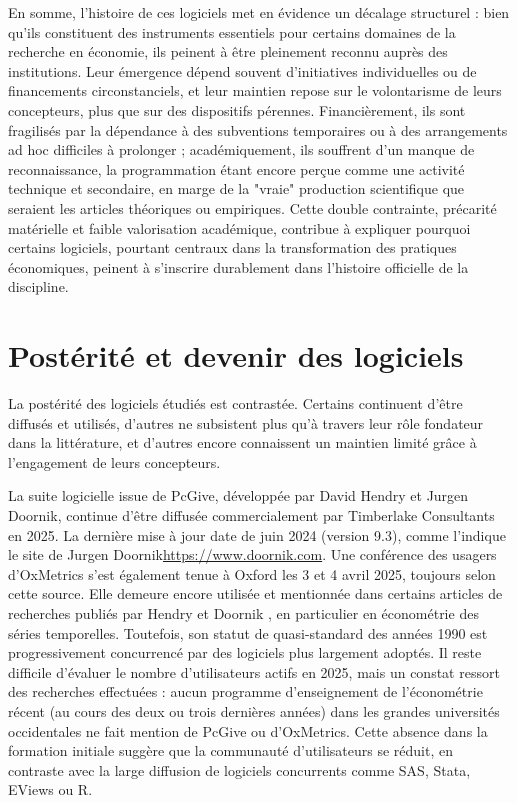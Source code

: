 En somme, l’histoire de ces logiciels met en évidence un décalage structurel : bien qu’ils constituent des instruments essentiels pour certains domaines de la recherche en économie, ils peinent à être pleinement reconnu auprès des institutions. Leur émergence dépend souvent d’initiatives individuelles ou de financements circonstanciels, et leur maintien repose sur le volontarisme de leurs concepteurs, plus que sur des dispositifs pérennes. Financièrement, ils sont fragilisés par la dépendance à des subventions temporaires ou à des arrangements ad hoc difficiles à prolonger ; académiquement, ils souffrent d’un manque de reconnaissance, la programmation étant encore perçue comme une activité technique et secondaire, en marge de la "vraie" production scientifique que seraient les articles théoriques ou empiriques. Cette double contrainte, précarité matérielle et faible valorisation académique, contribue à expliquer pourquoi certains logiciels, pourtant centraux dans la transformation des pratiques économiques, peinent à s’inscrire durablement dans l’histoire officielle de la discipline.




\section{Postérité et devenir des logiciels}


La postérité des logiciels étudiés est contrastée. Certains continuent d’être diffusés et utilisés, d’autres ne subsistent plus qu’à travers leur rôle fondateur dans la littérature, et d’autres encore connaissent un maintien limité grâce à l’engagement de leurs concepteurs.

La suite logicielle issue de PcGive, développée par David Hendry et Jurgen Doornik, continue d’être diffusée commercialement par Timberlake Consultants en 2025. La dernière mise à jour date de juin 2024 (version 9.3), comme l’indique le site de Jurgen Doornik\url{https://www.doornik.com}. Une conférence des usagers d’OxMetrics s’est également tenue à Oxford les 3 et 4 avril 2025, toujours selon cette source. Elle demeure encore utilisée et mentionnée dans certains articles de recherches publiés par Hendry et Doornik\cite{castleSelectingModelForecasting2021} \cite{castleDetectingBreaksTrends2025}, en particulier en économétrie des séries temporelles. Toutefois, son statut de quasi-standard des années 1990 est progressivement concurrencé par des logiciels plus largement adoptés. Il reste difficile d’évaluer le nombre d’utilisateurs actifs en 2025, mais un constat ressort des recherches effectuées : aucun programme d’enseignement de l'économétrie récent (au cours des deux ou trois dernières années) dans les grandes universités occidentales ne fait mention de PcGive ou d’OxMetrics. Cette absence dans la formation initiale suggère que la communauté d’utilisateurs se réduit, en contraste avec la large diffusion de logiciels concurrents comme SAS, Stata, EViews ou R.

